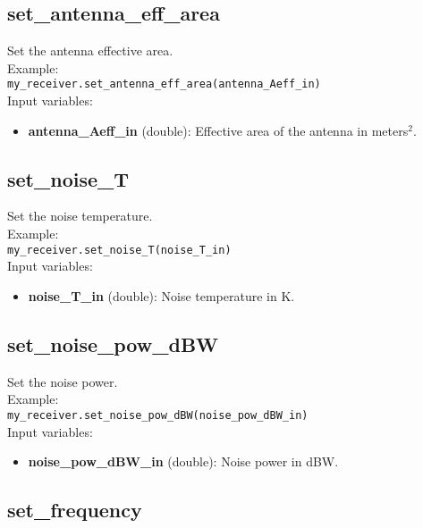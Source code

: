 \subsection{set\_antenna\_eff\_area}

Set the antenna effective area.\\

Example:\\

\texttt{my\_receiver.set\_antenna\_eff\_area(antenna\_Aeff\_in)}\\

Input variables:
\begin{itemize}
\item {\bf antenna\_Aeff\_in} (double): Effective area of the antenna in meters$^2$.
\end{itemize}


\subsection{set\_noise\_T}

Set the noise temperature.\\

Example:\\

\texttt{my\_receiver.set\_noise\_T(noise\_T\_in)}\\

Input variables:
\begin{itemize}
\item {\bf noise\_T\_in} (double): Noise temperature in K.
\end{itemize}


\subsection{set\_noise\_pow\_dBW}

Set the noise power.\\

Example:\\

\texttt{my\_receiver.set\_noise\_pow\_dBW(noise\_pow\_dBW\_in)}\\

Input variables:
\begin{itemize}
\item {\bf noise\_pow\_dBW\_in} (double): Noise power in dBW.
\end{itemize}


\subsection{set\_frequency}

